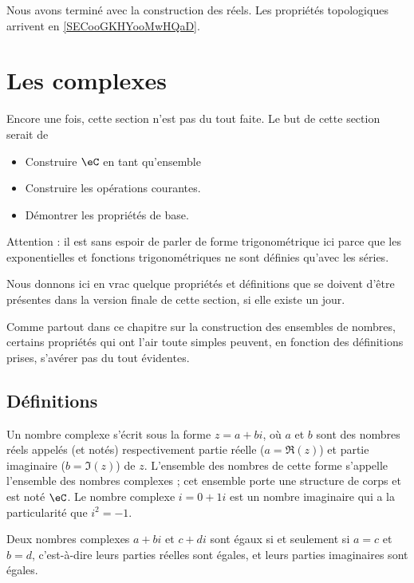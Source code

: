 Nous avons terminé avec la construction des réels. Les propriétés topologiques arrivent en \ref{SECooGKHYooMwHQaD}. 


\section{Les complexes}

\begin{probleme}
    Encore une fois, cette section n'est pas du tout faite. Le but de cette section serait de 
    \begin{itemize}
        \item Construire \( \eC\) en tant qu'ensemble
        \item Construire les opérations courantes.
        \item Démontrer les propriétés de base.
    \end{itemize}
    Attention : il est sans espoir de parler de forme trigonométrique ici parce que les exponentielles et fonctions trigonométriques ne sont définies qu'avec les séries.

    Nous donnons ici en vrac quelque propriétés et définitions que se doivent d'être présentes dans la version finale de cette section, si elle existe un jour.

    Comme partout dans ce chapitre sur la construction des ensembles de nombres, certains propriétés qui ont l'air toute simples peuvent, en fonction des définitions prises, s'avérer pas du tout évidentes.
\end{probleme}


 \subsection{Définitions}
 Un nombre complexe s'écrit sous la forme $z = a + b i$, où $a$ et $b$
 sont des nombres réels appelés (et notés) respectivement partie réelle
 ($a = \Re(z)$) et partie imaginaire ($b = \Im(z)$) de $z$. L'ensemble
 des nombres de cette forme s'appelle l'ensemble des nombres complexes
 ; cet ensemble porte une structure de corps et est noté $\eC$. Le
 nombre complexe $i = 0 + 1 i$ est un nombre imaginaire qui a la
 particularité que $i^2 = -1$.

 Deux nombres complexes $a + bi$ et $c + di$ sont égaux si et seulement
 si $a = c$ et $b = d$, c'est-à-dire leurs parties réelles sont égales,
 et leurs parties imaginaires sont égales.

